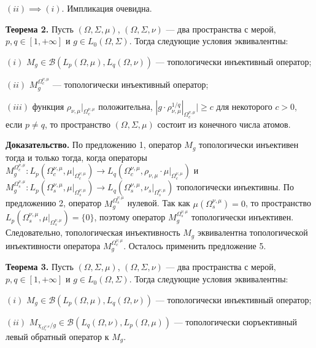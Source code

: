 \documentclass[11pt,twoside]{article}
\begin{document}
    $(ii)$$\implies$$ (i)$. Импликация очевидна.


        \textbf{Теорема 2.} Пусть $(\Omega,\Sigma,\mu)$, $(\Omega,\Sigma,\nu)$
        --- два пространства с мерой, $p,q\in[1,+\infty]$ и $g\in
    L_0(\Omega,\Sigma)$. Тогда следующие условия эквивалентны:

    $(i)$ $M_g\in\mathcal{B}(L_p(\Omega,\mu), L_q(\Omega,\nu))$ ---
        топологически инъективный оператор;

    $(ii)$ $M_g^{\Omega_c^{\nu,\mu}}$ --- топологически инъективный оператор;

    $(iii)$ функция $\rho_{\nu,\mu}|_{\Omega_c^{\nu,\mu}}$ положительна,
    $|g\cdot\rho_{\nu,\mu}^{1/q}|_{\Omega_c^{\nu,\mu}}|\geq c$ для некоторого
    $c>0$, если $p\neq q$, то пространство $(\Omega,\Sigma,\mu)$ состоит из
        конечного числа атомов.

        \textbf{Доказательство.} По предложению 1, оператор $M_g$ топологически
        инъективен тогда и только тогда, когда операторы
    $M_g^{\Omega_c^{\nu,\mu}}:
    L_p(\Omega_c^{\nu,\mu},\mu|_{\Omega_c^{\nu,\mu}})
    \to
    L_q(\Omega_c^{\nu,\mu},\rho_{\nu,\mu}\cdot\mu|_{\Omega_c^{\nu,\mu}})$ и
    $M_g^{\Omega_s^{\nu,\mu}}:
    L_p(\Omega_s^{\nu,\mu},\mu|_{\Omega_s^{\nu,\mu}})
    \to
    L_q(\Omega_s^{\nu,\mu},\nu_s|_{\Omega_s^{\nu,\mu}})$ топологически
        инъективны. По предложению 2, оператор $M_g^{\Omega_s^{\nu,\mu}}$
        нулевой. Так как $\mu(\Omega_s^{\nu,\mu})=0$, то пространство
    $L_p(\Omega_s^{\nu,\mu},\mu|_{\Omega_s^{\nu,\mu}})=\{0\}$, поэтому
        оператор $M_g^{\Omega_s^{\nu,\mu}}$ топологически инъективен.
        Следовательно, топологическая инъективность $M_g$ эквивалентна
        топологической инъективности оператора  $M_g^{\Omega_c^{\nu,\mu}}$.
        Осталось применить предложение 5.

        \textbf{Теорема 3.} Пусть $(\Omega,\Sigma,\mu)$, $(\Omega,\Sigma,\nu)$
        --- два пространства с мерой, $p,q\in[1,+\infty]$ и $g\in
    L_0(\Omega,\Sigma)$. Тогда следующие условия эквивалентны:

    $(i)$ $M_g\in\mathcal{B}(L_p(\Omega,\mu),L_q(\Omega,\nu))$ --- топологически
        инъективный оператор;

    $(ii)$ $M_{\chi_{\Omega_c^{\nu,\mu}}/g}\in\mathcal{B}(L_q(\Omega,\nu),
    L_p(\Omega,\mu))$ --- топологически сюръективный левый обратный оператор к
    $M_g$.
\end{document}
